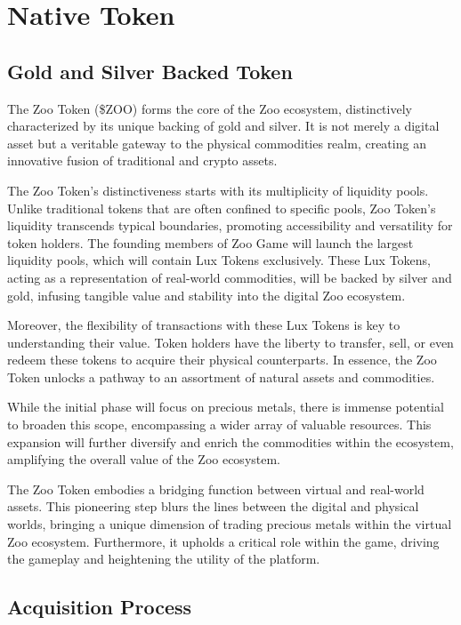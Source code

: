 \section{Native Token}

\subsection{Gold and Silver Backed Token}

The Zoo Token (\$ZOO) forms the core of the Zoo ecosystem, distinctively characterized by its unique backing of gold and silver. It is not merely a digital asset but a veritable gateway to the physical commodities realm, creating an innovative fusion of traditional and crypto assets.

The Zoo Token's distinctiveness starts with its multiplicity of liquidity pools. Unlike traditional tokens that are often confined to specific pools, Zoo Token's liquidity transcends typical boundaries, promoting accessibility and versatility for token holders. The founding members of Zoo Game will launch the largest liquidity pools, which will contain Lux Tokens exclusively. These Lux Tokens, acting as a representation of real-world commodities, will be backed by silver and gold, infusing tangible value and stability into the digital Zoo ecosystem.

Moreover, the flexibility of transactions with these Lux Tokens is key to understanding their value. Token holders have the liberty to transfer, sell, or even redeem these tokens to acquire their physical counterparts. In essence, the Zoo Token unlocks a pathway to an assortment of natural assets and commodities.

While the initial phase will focus on precious metals, there is immense potential to broaden this scope, encompassing a wider array of valuable resources. This expansion will further diversify and enrich the commodities within the ecosystem, amplifying the overall value of the Zoo ecosystem.

The Zoo Token embodies a bridging function between virtual and real-world assets. This pioneering step blurs the lines between the digital and physical worlds, bringing a unique dimension of trading precious metals within the virtual Zoo ecosystem. Furthermore, it upholds a critical role within the game, driving the gameplay and heightening the utility of the platform.

\subsection{Acquisition Process}

